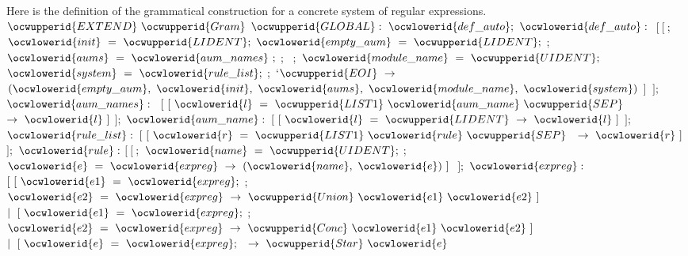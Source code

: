 \documentclass[12pt]{article}
\begin{document}
\ocwendcode{}\ocwindent{0.00em}
Here is the definition of the grammatical construction for a concrete
   system of regular expressions. 
\ocweol
\label{../ML/regular.ml:17147}%
\medskip
\ocwbegincode{}\ocwindent{0.00em}
$\ocwupperid{EXTEND}~\ocwupperid{Gram}$\ocweol
\ocwindent{1.00em}
$\ocwupperid{GLOBAL}:~\ocwlowerid{def\_auto};$\ocweol
\ocwindent{1.00em}
$\ocwlowerid{def\_auto}:~$\ocweol
\ocwindent{2.00em}
$[~[~$;~$\ocwlowerid{init}~=~\ocwupperid{LIDENT};~\ocwlowerid{empty\_aum}~=~\ocwupperid{LIDENT};$\ocweol
\ocwindent{4.00em}
;~$\ocwlowerid{aums}~=~\ocwlowerid{aum\_names}~;~$;~\ocweol
\ocwindent{4.00em}
;~$\ocwlowerid{module\_name}~=~\ocwupperid{UIDENT};~$\ocweol
\ocwindent{4.00em}
$\ocwlowerid{system}~=~\ocwlowerid{rule\_list};~$;~`$\ocwupperid{EOI}~\rightarrow{}$\ocweol
\ocwindent{5.50em}
$(\ocwlowerid{empty\_aum},~\ocwlowerid{init},~\ocwlowerid{aums},~\ocwlowerid{module\_name},~\ocwlowerid{system})$\ocweol
\ocwindent{3.00em}
$]~$\ocweol
\ocwindent{2.00em}
$];$\ocweol
\ocwindent{1.00em}
$\ocwlowerid{aum\_names}:~$\ocweol
\ocwindent{2.00em}
$[~[~\ocwlowerid{l}~=~\ocwupperid{LIST1}~\ocwlowerid{aum\_name}~\ocwupperid{SEP}~$~$\rightarrow{}~\ocwlowerid{l}~]$\ocweol
\ocwindent{2.00em}
$];$\ocweol
\ocwindent{1.00em}
$\ocwlowerid{aum\_name}:$\ocweol
\ocwindent{2.00em}
$[~[~\ocwlowerid{l}~=~\ocwupperid{LIDENT}~\rightarrow{}~\ocwlowerid{l}~]$\ocweol
\ocwindent{2.00em}
$];~$\ocweol
\ocwindent{1.00em}
$\ocwlowerid{rule\_list}:$\ocweol
\ocwindent{2.00em}
$[~[~\ocwlowerid{r}~=~\ocwupperid{LIST1}~\ocwlowerid{rule}~\ocwupperid{SEP}~$~$\rightarrow{}~\ocwlowerid{r}~]$\ocweol
\ocwindent{2.00em}
$];$\ocweol
\ocwindent{1.00em}
$\ocwlowerid{rule}:$\ocweol
\ocwindent{2.00em}
$[~[~$;~$\ocwlowerid{name}~=~\ocwupperid{UIDENT};~$;~$\ocwlowerid{e}~=~\ocwlowerid{expreg}~\rightarrow{}~(\ocwlowerid{name},~\ocwlowerid{e})~]~$\ocweol
\ocwindent{2.00em}
$];$\ocweol
\ocwindent{1.00em}
$\ocwlowerid{expreg}:$\ocweol
\ocwindent{2.00em}
$[~[~\ocwlowerid{e1}~=~\ocwlowerid{expreg};~$;~$\ocwlowerid{e2}~=~\ocwlowerid{expreg}~\rightarrow{}~\ocwupperid{Union}~\ocwlowerid{e1}~\ocwlowerid{e2}~]$\ocweol
\ocwindent{2.00em}
$\mid{}~[~\ocwlowerid{e1}~=~\ocwlowerid{expreg};~$;~$\ocwlowerid{e2}~=~\ocwlowerid{expreg}~\rightarrow{}~\ocwupperid{Conc}~\ocwlowerid{e1}~\ocwlowerid{e2}~]$\ocweol
\ocwindent{2.00em}
$\mid{}~[~\ocwlowerid{e}~=~\ocwlowerid{expreg};~$~$\rightarrow{}~\ocwupperid{Star}~\ocwlowerid{e}$\ocweol
\end{document}
